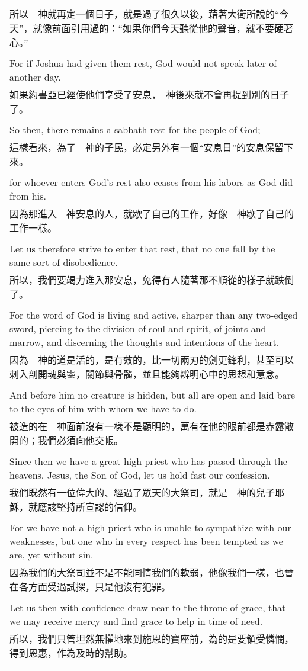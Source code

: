 \begin{tabularx}{\textwidth}{p{}}
所以　神就再定一個日子，就是過了很久以後，藉著大衛所說的“今天”，就像前面引用過的：“如果你們今天聽從他的聲音，就不要硬著心。” \\ \\
For if Joshua had given them rest, God would not speak later of another day. \\
如果約書亞已經使他們享受了安息，　神後來就不會再提到別的日子了。 \\ \\
So then, there remains a sabbath rest for the people of God; \\
這樣看來，為了　神的子民，必定另外有一個“安息日”的安息保留下來。 \\ \\
for whoever enters God's rest also ceases from his labors as God did from his. \\
因為那進入　神安息的人，就歇了自己的工作，好像　神歇了自己的工作一樣。 \\ \\
Let us therefore strive to enter that rest, that no one fall by the same sort of disobedience. \\
所以，我們要竭力進入那安息，免得有人隨著那不順從的樣子就跌倒了。 \\ \\
For the word of God is living and active, sharper than any two-edged sword, piercing to the division of soul and spirit, of joints and marrow, and discerning the thoughts and intentions of the heart. \\
因為　神的道是活的，是有效的，比一切兩刃的劍更鋒利，甚至可以刺入剖開魂與靈，關節與骨髓，並且能夠辨明心中的思想和意念。 \\ \\
And before him no creature is hidden, but all are open and laid bare to the eyes of him with whom we have to do. \\
被造的在　神面前沒有一樣不是顯明的，萬有在他的眼前都是赤露敞開的；我們必須向他交帳。 \\ \\
Since then we have a great high priest who has passed through the heavens, Jesus, the Son of God, let us hold fast our confession. \\
我們既然有一位偉大的、經過了眾天的大祭司，就是　神的兒子耶穌，就應該堅持所宣認的信仰。 \\ \\
For we have not a high priest who is unable to sympathize with our weaknesses, but one who in every respect has been tempted as we are, yet without sin. \\
因為我們的大祭司並不是不能同情我們的軟弱，他像我們一樣，也曾在各方面受過試探，只是他沒有犯罪。 \\ \\
Let us then with confidence draw near to the throne of grace, that we may receive mercy and find grace to help in time of need. \\
所以，我們只管坦然無懼地來到施恩的寶座前，為的是要領受憐憫，得到恩惠，作為及時的幫助。 \\ \\

\hline
\end{tabularx}


